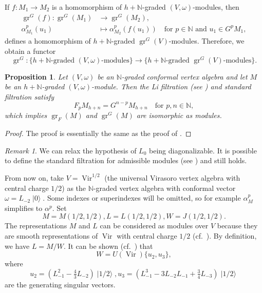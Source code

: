 \documentclass[a4paper, 12pt, reqno]{amsart}
\newtheorem{proposition}[theorem]{Proposition}
\theoremstyle{remark}
\newtheorem{remark}[theorem]{Remark}
\DeclareMathOperator{\Vir}{Vir}
\DeclareMathOperator{\gr}{gr}
\DeclareMathOperator{\vac}{|0\rangle}
\DeclareMathOperator{\vachalf}{|1/2\rangle}
\begin{document}
If $f: M_1 \to M_2$ is a homomorphism of $h + \mathbb{N}$-graded $(V, \omega)$-modules, then
\begin{align*}
  \gr^G(f): \gr^G(M_1) &\to \gr^G(M_2), \\
  \alpha^p_{M_1}(u_1) &\mapsto \alpha^p_{M_2}(f(u_1)) \quad \text{for }p \in \mathbb{N}\text{ and }u_1 \in G^pM_1,
\end{align*}
defines a homomorphism of $h + \mathbb{N}$-graded $\gr^G(V)$-modules.
Therefore, we obtain a functor
\begin{equation*}
  \gr^G: \{\text{$h + \mathbb{N}$-graded $(V, \omega)$-modules}\} \to \{\text{$h + \mathbb{N}$-graded $\gr^G(V)$-modules}\}.
\end{equation*}

\begin{proposition}
  \label{prp:14}
  Let $(V, \omega)$ be an $\mathbb{N}$-graded conformal vertex algebra and let $M$ be an $h + \mathbb{N}$-graded $(V, \omega)$-module.
  Then the Li filtration (see \cite{li_abelianizing_2005}) and standard filtration satisfy
  \begin{equation*}
    F_pM_{h + n} = G^{n - p}M_{h + n} \quad \text{for }p, n \in \mathbb{N},
  \end{equation*}
  which implies $\gr_F(M)$ and $\gr^G(M)$ are isomorphic as modules.
\end{proposition}

\begin{proof}
  The proof is essentially the same as the proof of \cite[Proposition 2.6.1]{arakawa_remark_2012}.
\end{proof}

\begin{remark}
  \label{rmk:2}
  We can relax the hypothesis of $L_0$ being diagonalizable.
  It is possible to define the standard filtration for admissible modules (see \cite[Definition 3.3]{dong_twisted_1998}) and  still holds.
\end{remark}

From now on, take $V = \Vir^{1/2}$ (the universal Virasoro vertex algebra with central charge $1/2$) as the $\mathbb{N}$-graded vertex algebra with conformal vector $\omega = L_{-2}\vac$.
Some indexes or superindexes will be omitted, so for example $\alpha^p_M$ simplifies to $\alpha^p$.
Set
\begin{equation*}
  M = M(1/2, 1/2), L = L(1/2, 1/2), W = J(1/2, 1/2).
\end{equation*}
The representations $M$ and $L$ can be considered as modules over $V$ because they are smooth representations of $\Vir$ with central charge $1/2$ (cf.\ \cite[Theorem 6.1.7]{lepowsky_introduction_2004}).
By definition, we have $L = M/W$.
It can be shown (cf.\ \cite{astashkevich_structure_1997}) that
\begin{equation}
  \label{eq:3}
  W = U(\Vir)\{u_2, u_3\},
\end{equation}
where
\begin{equation*}
  u_2 = (L_{-1}^2 - \tfrac{4}{3}L_{-2})\vachalf, u_3 = (L_{-1}^3 - 3L_{-2}L_{-1} + \tfrac{3}{4}L_{-3})\vachalf
\end{equation*}
are the generating singular vectors.
\end{document}
